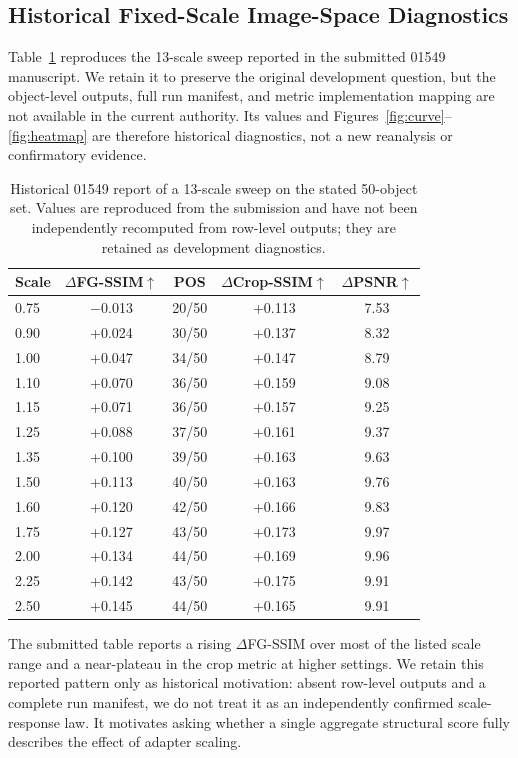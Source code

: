 \documentclass[times,twocolumn,final]{elsarticle}
\begin{document}
\subsection{Historical Fixed-Scale Image-Space Diagnostics}
\label{subsec:tradeoff}

Table~\ref{tab:sweep} reproduces the 13-scale sweep reported in the submitted 01549 manuscript. We retain it to preserve the original development question, but the object-level outputs, full run manifest, and metric implementation mapping are not available in the current authority. Its values and Figures~\ref{fig:curve}--\ref{fig:heatmap} are therefore historical diagnostics, not a new reanalysis or confirmatory evidence.

\begin{table}[t]
\centering
\caption{Historical 01549 report of a 13-scale sweep on the stated 50-object set. Values are reproduced from the submission and have not been independently recomputed from row-level outputs; they are retained as development diagnostics.}
\label{tab:sweep}
\small
\begin{tabular}{lcccc}
\toprule
Scale & $\Delta$FG-SSIM$\uparrow$ & POS & $\Delta$Crop-SSIM$\uparrow$ & $\Delta$PSNR$\uparrow$ \\
\midrule
0.75 & $-$0.013 & 20/50 & +0.113 & 7.53 \\
0.90 & +0.024 & 30/50 & +0.137 & 8.32 \\
1.00 & +0.047 & 34/50 & +0.147 & 8.79 \\
1.10 & +0.070 & 36/50 & +0.159 & 9.08 \\
1.15 & +0.071 & 36/50 & +0.157 & 9.25 \\
1.25 & +0.088 & 37/50 & +0.161 & 9.37 \\
1.35 & +0.100 & 39/50 & +0.163 & 9.63 \\
1.50 & +0.113 & 40/50 & +0.163 & 9.76 \\
1.60 & +0.120 & 42/50 & +0.166 & 9.83 \\
1.75 & +0.127 & 43/50 & +0.173 & 9.97 \\
2.00 & +0.134 & 44/50 & +0.169 & 9.96 \\
2.25 & +0.142 & 43/50 & +0.175 & 9.91 \\
2.50 & +0.145 & 44/50 & +0.165 & 9.91 \\
\bottomrule
\end{tabular}
\end{table}

The submitted table reports a rising $\Delta$FG-SSIM over most of the listed scale range and a near-plateau in the crop metric at higher settings. We retain this reported pattern only as historical motivation: absent row-level outputs and a complete run manifest, we do not treat it as an independently confirmed scale-response law. It motivates asking whether a single aggregate structural score fully describes the effect of adapter scaling.
\end{document}
